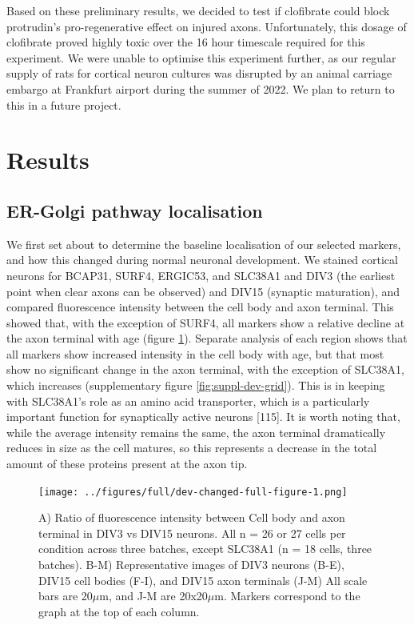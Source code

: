 \documentclass[
  12pt,
  a4paper,
]{book}
\begin{document}
Based on these preliminary results, we decided to test if clofibrate could block protrudin's pro-regenerative effect on injured axons. Unfortunately, this dosage of clofibrate proved highly toxic over the 16 hour timescale required for this experiment. We were unable to optimise this experiment further, as our regular supply of rats for cortical neuron cultures was disrupted by an animal carriage embargo at Frankfurt airport during the summer of 2022. We plan to return to this in a future project.

\hypertarget{results-2}{%
\section{Results}\label{results-2}}

\hypertarget{er-golgi-pathway-localisation}{%
\subsection{ER-Golgi pathway localisation}\label{er-golgi-pathway-localisation}}

We first set about to determine the baseline localisation of our selected markers, and how this changed during normal neuronal development. We stained cortical neurons for BCAP31, SURF4, ERGIC53, and SLC38A1 and DIV3 (the earliest point when clear axons can be observed) and DIV15 (synaptic maturation), and compared fluorescence intensity between the cell body and axon terminal. This showed that, with the exception of SURF4, all markers show a relative decline at the axon terminal with age (figure \ref{fig:dev-changed-full-figure}). Separate analysis of each region shows that all markers show increased intensity in the cell body with age, but that most show no significant change in the axon terminal, with the exception of SLC38A1, which increases (supplementary figure \ref{fig:suppl-dev-grid}). This is in keeping with SLC38A1's role as an amino acid transporter, which is a particularly important function for synaptically active neurons {[}115{]}. It is worth noting that, while the average intensity remains the same, the axon terminal dramatically reduces in size as the cell matures, so this represents a decrease in the total amount of these proteins present at the axon tip.

\begin{figure}
\centering
\texttt{[image: ../figures/full/dev-changed-full-figure-1.png]}
\caption{\label{fig:dev-changed-full-figure}A) Ratio of fluorescence intensity between Cell body and axon terminal in DIV3 vs DIV15 neurons. All n = 26 or 27 cells per condition across three batches, except SLC38A1 (n = 18 cells, three batches). B-M) Representative images of DIV3 neurons (B-E), DIV15 cell bodies (F-I), and DIV15 axon terminals (J-M) All scale bars are 20\(\mu\)m, and J-M are 20x20\(\mu\)m. Markers correspond to the graph at the top of each column.}
\end{figure}
\end{document}
